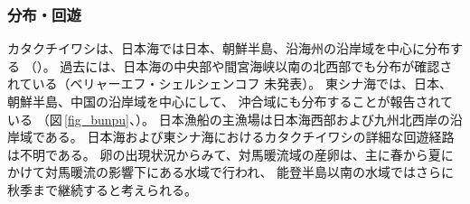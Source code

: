 \subsubsection{分布・回遊}
カタクチイワシは、日本海では日本、朝鮮半島、沿海州の沿岸域を中心に分布する
（\citealt{Ochiai1986}）。
過去には、日本海の中央部や間宮海峡以南の北西部でも分布が確認されている（ベリャーエフ・シェルシェンコフ 未発表）。
東シナ海では、日本、朝鮮半島、中国の沿岸域を中心にして、
沖合域にも分布することが報告されている
（図\,\ref{fig_bunpu}、\citealp{Iversen1993, Ohshimo1996}）。
日本漁船の主漁場は日本海西部および九州北西岸の沿岸域である。
日本海および東シナ海におけるカタクチイワシの詳細な回遊経路は不明である。
卵の出現状況からみて、対馬暖流域の産卵は、主に春から夏にかけて対馬暖流の影響下にある水域で行われ、
能登半島以南の水域ではさらに秋季まで継続すると考えられる\citep{Uchida1958}。
